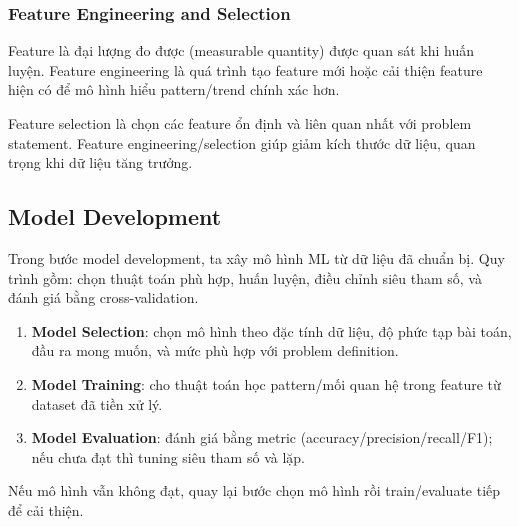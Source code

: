 \subsubsection{Feature Engineering and Selection}

\begin{dinhnghia}[title={Tạo feature mới}]
Feature là đại lượng đo được (measurable quantity) được quan sát khi huấn luyện.
Feature engineering là quá trình tạo feature mới hoặc cải thiện feature hiện có để mô hình hiểu pattern/trend chính xác hơn.
\end{dinhnghia}

\begin{dinhnghia}[title={Chọn feature}]
Feature selection là chọn các feature ổn định và liên quan nhất với problem statement.
Feature engineering/selection giúp giảm kích thước dữ liệu, quan trọng khi dữ liệu tăng trưởng.
\end{dinhnghia}

\subsection{Model Development}

\begin{dongco}[title={Xây mô hình từ dữ liệu đã chuẩn bị}]
Trong bước model development, ta xây mô hình ML từ dữ liệu đã chuẩn bị.
Quy trình gồm: chọn thuật toán phù hợp, huấn luyện, điều chỉnh siêu tham số, và đánh giá bằng cross-validation.
\end{dongco}

\begin{phuongphap}[title={Ba bước chính}]
\begin{enumerate}
  \item \textbf{Model Selection}: chọn mô hình theo đặc tính dữ liệu, độ phức tạp bài toán, đầu ra mong muốn, và mức phù hợp với problem definition.
  \item \textbf{Model Training}: cho thuật toán học pattern/mối quan hệ trong feature từ dataset đã tiền xử lý.
  \item \textbf{Model Evaluation}: đánh giá bằng metric (accuracy/precision/recall/F1); nếu chưa đạt thì tuning siêu tham số và lặp.
\end{enumerate}
\end{phuongphap}

\begin{luuy}[title={Lặp lại nếu chưa đạt}]
Nếu mô hình vẫn không đạt, quay lại bước chọn mô hình rồi train/evaluate tiếp để cải thiện.
\end{luuy}


